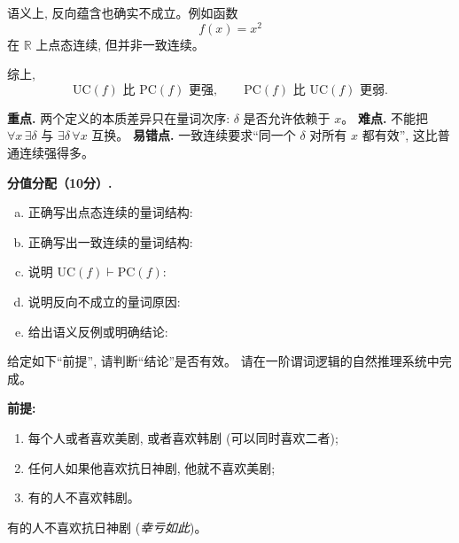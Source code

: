 \documentclass[a4paper, justified]{tufte-handout}
\begin{document}
\begin{solution}
  语义上, 反向蕴含也确实不成立。例如函数
  \[
    f(x) = x^{2}
  \]
  在 $\mathbb{R}$ 上点态连续, 但并非一致连续。

  综上,
  \[
    \mathrm{UC}(f) \text{ 比 } \mathrm{PC}(f) \text{ 更强},
    \qquad
    \mathrm{PC}(f) \text{ 比 } \mathrm{UC}(f) \text{ 更弱}.
  \]

  \begin{remark}
    \textbf{重点.} 两个定义的本质差异只在量词次序: $\delta$ 是否允许依赖于 $x$。
    \textbf{难点.} 不能把 $\forall x\, \exists \delta$ 与 $\exists \delta\, \forall x$ 互换。
    \textbf{易错点.} 一致连续要求“同一个 $\delta$ 对所有 $x$ 都有效”, 这比普通连续强得多。
  \end{remark}

  \textbf{分值分配（10分）.}
  \begin{enumerate}[(a)]
    \item 正确写出点态连续的量词结构: 
    \item 正确写出一致连续的量词结构: 
    \item 说明 $\mathrm{UC}(f) \vdash \mathrm{PC}(f)$: 
    \item 说明反向不成立的量词原因: 
    \item 给出语义反例或明确结论: 
  \end{enumerate}
\end{solution}

\newpage
\begin{problem}
  给定如下``前提'', 请判断``结论''是否有效。
  请在一阶谓词逻辑的自然推理系统中完成。

  {\bf 前提:}
  \begin{enumerate}[(1)]
    \item 每个人或者喜欢美剧, 或者喜欢韩剧 (可以同时喜欢二者);
    \item 任何人如果他喜欢抗日神剧, 他就不喜欢美剧;
    \item 有的人不喜欢韩剧。
  \end{enumerate}

  \vspace{0.20cm}
   有的人不喜欢抗日神剧 ({\it 幸亏如此})。
\end{problem}
\end{document}
